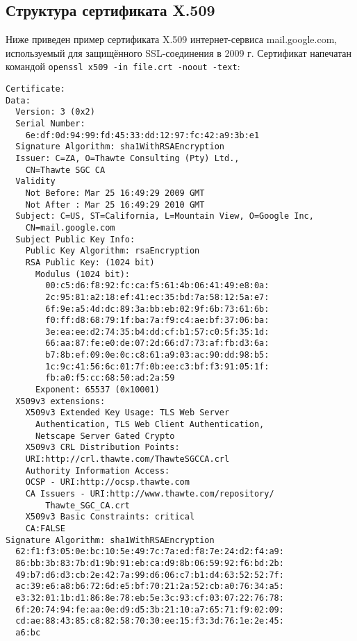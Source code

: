 \subsection{Структура сертификата X.509}

Ниже приведен пример сертификата X.509 интернет-сервиса mail.google.com, используемый для защищённого SSL-соединения в 2009 г. Сертификат напечатан командой \texttt{openssl x509 -in file.crt -noout -text}:

{\small \begin{verbatim}
Certificate:
Data:
  Version: 3 (0x2)
  Serial Number:
    6e:df:0d:94:99:fd:45:33:dd:12:97:fc:42:a9:3b:e1
  Signature Algorithm: sha1WithRSAEncryption
  Issuer: C=ZA, O=Thawte Consulting (Pty) Ltd.,
    CN=Thawte SGC CA
  Validity
    Not Before: Mar 25 16:49:29 2009 GMT
    Not After : Mar 25 16:49:29 2010 GMT
  Subject: C=US, ST=California, L=Mountain View, O=Google Inc,
    CN=mail.google.com
  Subject Public Key Info:
    Public Key Algorithm: rsaEncryption
    RSA Public Key: (1024 bit)
      Modulus (1024 bit):
        00:c5:d6:f8:92:fc:ca:f5:61:4b:06:41:49:e8:0a:
        2c:95:81:a2:18:ef:41:ec:35:bd:7a:58:12:5a:e7:
        6f:9e:a5:4d:dc:89:3a:bb:eb:02:9f:6b:73:61:6b:
        f0:ff:d8:68:79:1f:ba:7a:f9:c4:ae:bf:37:06:ba:
        3e:ea:ee:d2:74:35:b4:dd:cf:b1:57:c0:5f:35:1d:
        66:aa:87:fe:e0:de:07:2d:66:d7:73:af:fb:d3:6a:
        b7:8b:ef:09:0e:0c:c8:61:a9:03:ac:90:dd:98:b5:
        1c:9c:41:56:6c:01:7f:0b:ee:c3:bf:f3:91:05:1f:
        fb:a0:f5:cc:68:50:ad:2a:59
      Exponent: 65537 (0x10001)
  X509v3 extensions:
    X509v3 Extended Key Usage: TLS Web Server
      Authentication, TLS Web Client Authentication,
      Netscape Server Gated Crypto
    X509v3 CRL Distribution Points:
    URI:http://crl.thawte.com/ThawteSGCCA.crl
    Authority Information Access:
    OCSP - URI:http://ocsp.thawte.com
    CA Issuers - URI:http://www.thawte.com/repository/
        Thawte_SGC_CA.crt
    X509v3 Basic Constraints: critical
    CA:FALSE
Signature Algorithm: sha1WithRSAEncryption
  62:f1:f3:05:0e:bc:10:5e:49:7c:7a:ed:f8:7e:24:d2:f4:a9:
  86:bb:3b:83:7b:d1:9b:91:eb:ca:d9:8b:06:59:92:f6:bd:2b:
  49:b7:d6:d3:cb:2e:42:7a:99:d6:06:c7:b1:d4:63:52:52:7f:
  ac:39:e6:a8:b6:72:6d:e5:bf:70:21:2a:52:cb:a0:76:34:a5:
  e3:32:01:1b:d1:86:8e:78:eb:5e:3c:93:cf:03:07:22:76:78:
  6f:20:74:94:fe:aa:0e:d9:d5:3b:21:10:a7:65:71:f9:02:09:
  cd:ae:88:43:85:c8:82:58:70:30:ee:15:f3:3d:76:1e:2e:45:
  a6:bc
\end{verbatim}}

